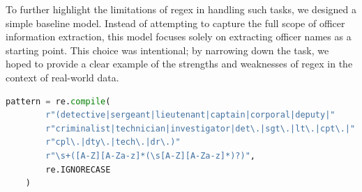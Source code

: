 \documentclass{article}
\begin{document}
To further highlight the limitations of regex in handling such tasks, we designed a simple baseline model. Instead of attempting to capture the full scope of officer information extraction, this model focuses solely on extracting officer names as a starting point. This choice was intentional; by narrowing down the task, we hoped to provide a clear example of the strengths and weaknesses of regex in the context of real-world data.

\begin{lstlisting}[language=Python, caption=Code Snippet 1]
    pattern = re.compile(
        r"(detective|sergeant|lieutenant|captain|corporal|deputy|"
        r"criminalist|technician|investigator|det\.|sgt\.|lt\.|cpt\.|"
        r"cpl\.|dty\.|tech\.|dr\.)"
        r"\s+([A-Z][A-Za-z]*(\s[A-Z][A-Za-z]*)?)", 
        re.IGNORECASE
    )
\end{lstlisting}
\end{document}

